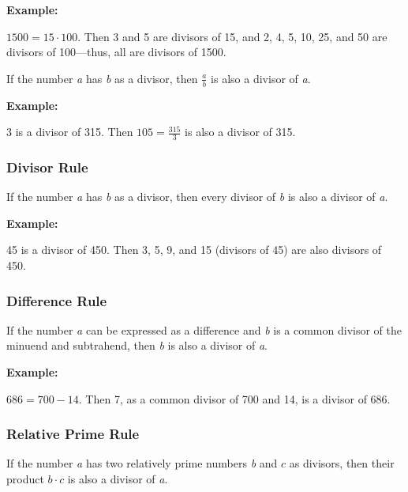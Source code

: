 \textbf{Example:}
\vspace{\baselineskip}

\( 1500 = 15 \cdot 100 \). Then 3 and 5 are divisors of 15, and 2, 4, 5, 10, 25, and 50 are divisors of 
100—thus, all are divisors of 1500.


If the number \emph{a} has \emph{b} as a divisor, then \( \frac{a}{b} \) is also a divisor of \emph{a}.
\vspace{\baselineskip}

\textbf{Example:}
\vspace{\baselineskip}
 
3 is a divisor of 315. Then \( 105 = \frac{315}{3} \) is also a divisor of 315.

\subsubsection{Divisor Rule}

If the number \emph{a} has \emph{b} as a divisor, then every divisor of \emph{b} is also a divisor of 
\emph{a}.
\vspace{\baselineskip}

\textbf{Example:}
\vspace{\baselineskip}
 
45 is a divisor of 450. Then 3, 5, 9, and 15 (divisors of 45) are also divisors of 450.

\subsubsection{Difference Rule}

If the number \emph{a} can be expressed as a difference and \emph{b} is a common divisor of the minuend 
and subtrahend, then \emph{b} is also a divisor of \emph{a}. \\
\vspace{\baselineskip}

\textbf{Example:}
\vspace{\baselineskip}

\( 686 = 700 - 14 \). Then 7, as a common divisor of 700 and 14, is a divisor of 686.

\subsubsection{Relative Prime Rule}

If the number \emph{a} has two relatively prime numbers \emph{b} and \( c \) as divisors, then their 
product \( b \cdot c \) is also a divisor of \emph{a}. \\
\vspace{\baselineskip}

